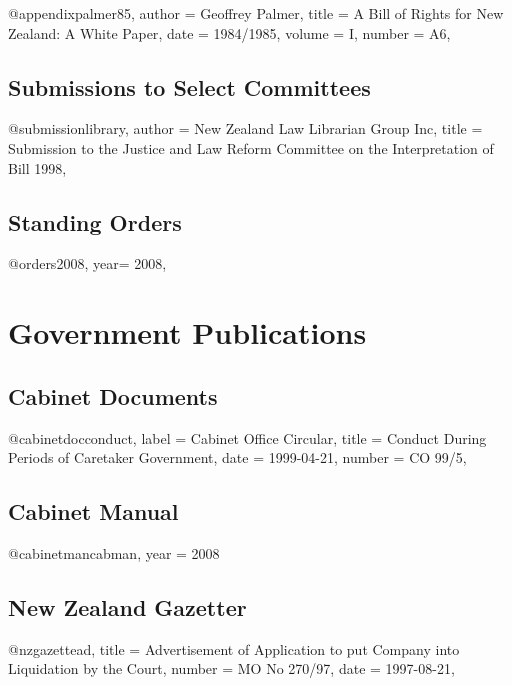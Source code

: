 \documentclass{book}
\begin{document}
\begin{bib}
@appendix{palmer85,
author = {Geoffrey Palmer},
title = {A Bill of Rights for New Zealand: A White Paper},
date = {1984/1985},
volume = {I},
number = {A6},
}
\end{bib}

\subsection{Submissions to Select Committees}
\begin{bib}
@submission{library,
author = {New Zealand Law Librarian Group Inc},
title = {Submission to the Justice and Law Reform Committee on the Interpretation of Bill 1998},
}
\end{bib}

\subsection{Standing Orders}
\begin{bib}
@orders{2008,
year= {2008},
}
\end{bib}

\section{Government Publications}

\subsection{Cabinet Documents}
\begin{bib}
@cabinetdoc{conduct,
label = {Cabinet Office Circular},
title = {Conduct During Periods of Caretaker Government},
date = {1999-04-21},
number = {CO 99/5},
}
\end{bib}

\subsection{Cabinet Manual}
\begin{bib}
@cabinetman{cabman,
year = {2008}
}
\end{bib}

\subsection{New Zealand Gazetter}
\begin{bib}
@nzgazette{ad,
title = {Advertisement of Application to put Company into Liquidation by the Court},
number = {MO No 270/97},
date = {1997-08-21},
}
\end{bib}
\end{document}
